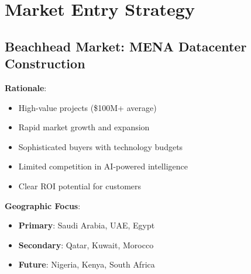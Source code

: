 \documentclass[business]{../templates/infraradar-main}
\begin{document}
\section{Market Entry Strategy}

\subsection{Beachhead Market: MENA Datacenter Construction}
\textbf{Rationale}:
\begin{itemize}
    \item High-value projects (\$100M+ average)
    \item Rapid market growth and expansion
    \item Sophisticated buyers with technology budgets
    \item Limited competition in AI-powered intelligence
    \item Clear ROI potential for customers
\end{itemize}

\textbf{Geographic Focus}:
\begin{itemize}
    \item \textbf{Primary}: Saudi Arabia, UAE, Egypt
    \item \textbf{Secondary}: Qatar, Kuwait, Morocco
    \item \textbf{Future}: Nigeria, Kenya, South Africa
\end{itemize}
\end{document}
